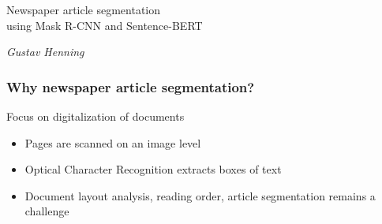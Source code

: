 \documentclass[aspectratio=1610]{beamer}
\begin{document}
\startpage
\begin{frame}

  \vspace{0.02\textheight}
  
  \begin{Large}
    Newspaper article segmentation \\
    using Mask R-CNN and Sentence-BERT
  \end{Large}



  \vspace{0.1\textheight}

  \begin{small}
    \textit{Gustav Henning}
  \end{small}
\end{frame}


\normalpage
\begin{frame}
  \frametitle{Why newspaper article segmentation?}

  \begin{block}{Focus on digitalization of documents}
    \begin{itemize}
    \item Pages are scanned on an image level
    \item Optical Character Recognition extracts boxes of text
    \item Document layout analysis, reading order, article segmentation remains a challenge
    \end{itemize}
  \end{block}

\end{frame}
\normalpage
\end{document}
